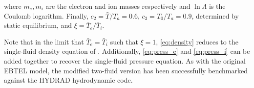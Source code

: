\documentclass[tighten,apj]{emulateapj}
\begin{document}
		where $m_e,m_i$ are the electron and ion masses respectively and $\ln{\Lambda}$ is the Coulomb logarithm. Finally, $c_2=\bar{T}/T_a=0.6$, $c_3=T_0/T_a=0.9$, determined by static equilibrium, and $\xi=\bar{T}_e/\bar{T}_i$.
		\par Note that in the limit that $\bar{T}_e=\bar{T}_i$ such that $\xi=1$, \autoref{eq:density} reduces to the single-fluid density equation of \citet{cargill_enthalpy-based_2012}. Additionally, \autoref{eq:press_e} and \autoref{eq:press_i} can be added together to recover the single-fluid pressure equation. As with the original EBTEL model, the modified two-fluid version has been successfully benchmarked against the HYDRAD hydrodynamic code.
	
	
	\clearpage
\end{document}
